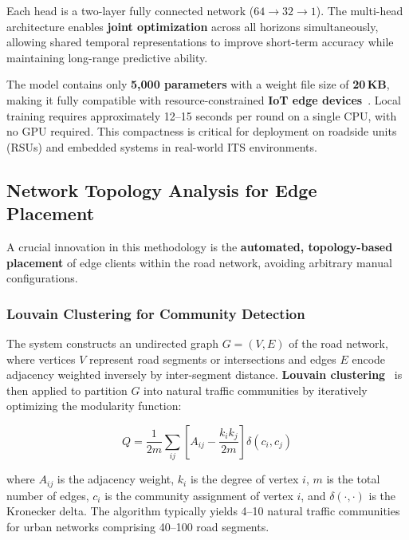 \documentclass[pdflatex,sn-mathphys-num]{sn-jnl}
\theoremstyle{thmstyleone}
\theoremstyle{thmstyletwo}
\theoremstyle{thmstylethree}
\begin{document}
Each head is a two-layer fully connected network ($64 \to 32 \to 1$). The
multi-head architecture enables \textbf{joint optimization} across all horizons
simultaneously, allowing shared temporal representations to improve short-term
accuracy while maintaining long-range predictive ability.

The model contains only \textbf{5,000 parameters} with a weight file size of
\textbf{20\,KB}, making it fully compatible with resource-constrained
\textbf{IoT edge devices}~\cite{shi2016edge,mach2017mobile}. Local training
requires approximately 12--15 seconds per round on a single CPU, with no GPU
required. This compactness is critical for deployment on roadside units (RSUs)
and embedded systems in real-world ITS environments.

\subsection{Network Topology Analysis for Edge Placement}

A crucial innovation in this methodology is the \textbf{automated, topology-based
placement} of edge clients within the road network, avoiding arbitrary manual
configurations.

\subsubsection{Louvain Clustering for Community Detection}

The system constructs an undirected graph $G = (V, E)$ of the road network, where
vertices $V$ represent road segments or intersections and edges $E$ encode
adjacency weighted inversely by inter-segment distance. \textbf{Louvain
clustering}~\cite{blondel2008louvain} is then applied to partition $G$ into
natural traffic communities by iteratively optimizing the modularity function:

\begin{equation}
    Q = \frac{1}{2m} \sum_{ij} \left[ A_{ij} - \frac{k_i k_j}{2m} \right]
    \delta(c_i, c_j)
    \label{eq:modularity}
\end{equation}

\noindent where $A_{ij}$ is the adjacency weight, $k_i$ is the degree of vertex
$i$, $m$ is the total number of edges, $c_i$ is the community assignment of
vertex $i$, and $\delta(\cdot,\cdot)$ is the Kronecker delta. The algorithm
typically yields 4--10 natural traffic communities for urban networks comprising
40--100 road segments.
\end{document}
